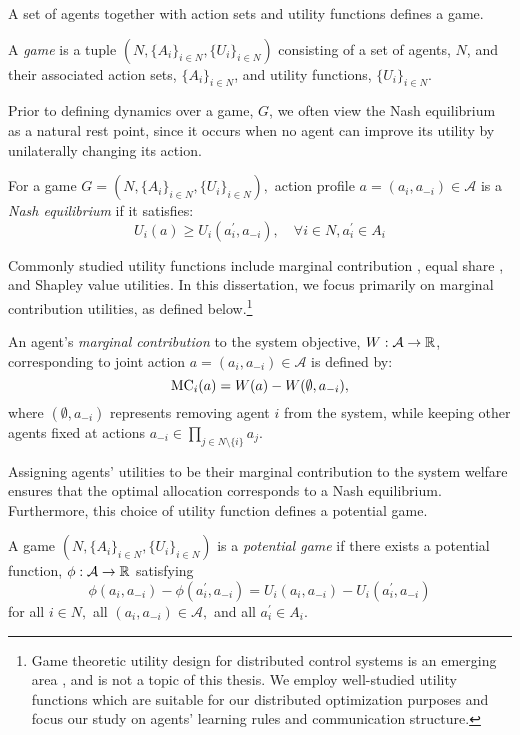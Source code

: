 A set of agents together with action sets and utility functions defines a game.

\begin{defn}
A {\it game} is a tuple $(N,\{A_i\}_{i\in N}, \{U_i\}_{i\in N})$ consisting of a set of agents, $N$, and their associated action sets, $\{A_i\}_{i\in N}$, and utility functions, $\{U_i\}_{i\in N}$.
\end{defn}

Prior to defining dynamics over a game, $G$, we often view the Nash equilibrium as a natural rest point, since it occurs when no agent can improve its utility by unilaterally changing its action.

\begin{defn}
For a game $G = \left(N,\{A_i\}_{i\in N},\{U_i\}_{i\in N}\right),$ action profile $a = (a_i,a_{-i})\in \mathcal{A}$ is a {\it Nash equilibrium} \cite{Nash1950} if it satisfies:
$$U_i(a)\geq U_i(a_i^\prime,a_{-i}),\quad \forall i\in N, a_i^\prime\in A_i$$
\end{defn}


Commonly studied utility functions include marginal contribution \cite{Wolpert1999}, equal share \cite{Arslan2007,Marden2008}, and Shapley value \cite{Shapley1964} utilities. In this dissertation, we focus primarily on marginal contribution utilities, as defined below.\footnote{Game theoretic utility design for distributed control systems is an emerging area \cite{Marden2013d}, and is not a topic of this thesis. We employ well-studied utility functions which are suitable for our distributed optimization purposes and focus our study on agents' learning rules and communication structure.} 



\begin{defn}
An agent's {\it marginal contribution}\cite{Wolpert1999} to the system objective, $W:\mathcal{A}\to \mathbb{R}$, corresponding to joint action $a = (a_i,a_{-i})\in \mathcal{A}$ is defined by:
$${\rm MC}_i(a) = W(a) - W(\emptyset,a_{-i}),$$
where $(\emptyset,a_{-i})$ represents removing agent $i$ from the system, while keeping other agents fixed at actions $a_{-i}\in \prod_{j\in N\setminus\{i\}}a_j.$
\end{defn}

Assigning agents' utilities to be their marginal contribution to the system welfare ensures that the optimal allocation corresponds to a Nash equilibrium. Furthermore, this choice of utility function defines a potential game.

\begin{defn}
A game $(N,\{A_i\}_{i\in N}, \{U_i\}_{i\in N})$ is a {\it potential game}\cite{Monderer1996} if there exists a potential function, $\phi:\mathcal{A}\to \mathbb{R}$ satisfying
$$\phi(a_i,a_{-i}) - \phi(a_i^\prime,a_{-i}) = U_i(a_i,a_{-i}) - U_i(a_i^\prime,a_{-i})$$
for all $i\in N,$ all $(a_i,a_{-i})\in \mathcal{A},$ and all $a_i^\prime\in A_i.$
\end{defn}

